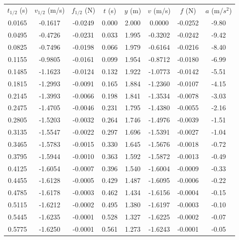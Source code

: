 \begin{longtable}{|c|c|c|c|c|c|c|c|}
    \hline
    \rowcolor{azulito}\multicolumn{8}{|c|}{Cono 3} \\
    \hline
    \rowcolor{azulito} $t_{1/2}$ (s) & $v_{1/2}$ (m/s) & $f_{1/2} $ (N)& $t$ (s)& $y$ (m)& $v$ (m/s)& $f$ (N)& $a$ (m/$s^2$)\\
    \endhead
    \hline 0.0165 & -0.1617 & -0.0249 & 0.000 & 2.000 & 0.0000 & -0.0252 & -9.80 \\
    \hline 0.0495 & -0.4726 & -0.0231 & 0.033 & 1.995 & -0.3202 & -0.0242 & -9.42 \\
    \hline 0.0825 & -0.7496 & -0.0198 & 0.066 & 1.979 & -0.6164 & -0.0216 & -8.40 \\
    \hline 0.1155 & -0.9805 & -0.0161 & 0.099 & 1.954 & -0.8712 & -0.0180 & -6.99 \\
    \hline 0.1485 & -1.1623 & -0.0124 & 0.132 & 1.922 & -1.0773 & -0.0142 & -5.51 \\
    \hline 0.1815 & -1.2993 & -0.0091 & 0.165 & 1.884 & -1.2360 & -0.0107 & -4.15 \\
    \hline 0.2145 & -1.3993 & -0.0066 & 0.198 & 1.841 & -1.3534 & -0.0078 & -3.03 \\
    \hline 0.2475 & -1.4705 & -0.0046 & 0.231 & 1.795 & -1.4380 & -0.0055 & -2.16 \\
    \hline 0.2805 & -1.5203 & -0.0032 & 0.264 & 1.746 & -1.4976 & -0.0039 & -1.51 \\
    \hline 0.3135 & -1.5547 & -0.0022 & 0.297 & 1.696 & -1.5391 & -0.0027 & -1.04 \\
    \hline 0.3465 & -1.5783 & -0.0015 & 0.330 & 1.645 & -1.5676 & -0.0018 & -0.72 \\
    \hline 0.3795 & -1.5944 & -0.0010 & 0.363 & 1.592 & -1.5872 & -0.0013 & -0.49 \\
    \hline 0.4125 & -1.6054 & -0.0007 & 0.396 & 1.540 & -1.6004 & -0.0009 & -0.33 \\
    \hline 0.4455 & -1.6128 & -0.0005 & 0.429 & 1.487 & -1.6095 & -0.0006 & -0.22 \\
    \hline 0.4785 & -1.6178 & -0.0003 & 0.462 & 1.434 & -1.6156 & -0.0004 & -0.15 \\
    \hline 0.5115 & -1.6212 & -0.0002 & 0.495 & 1.380 & -1.6197 & -0.0003 & -0.10 \\
    \hline 0.5445 & -1.6235 & -0.0001 & 0.528 & 1.327 & -1.6225 & -0.0002 & -0.07 \\
    \hline 0.5775 & -1.6250 & -0.0001 & 0.561 & 1.273 & -1.6243 & -0.0001 & -0.05 \\

\end{longtable}
